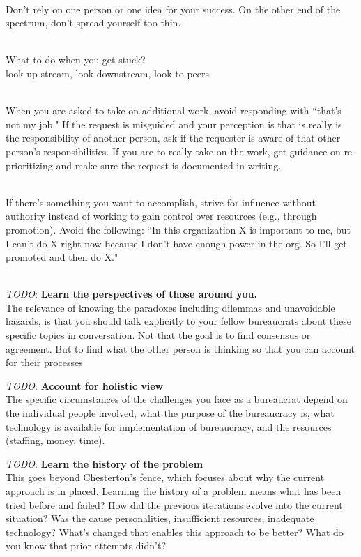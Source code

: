\ \\

Don't rely on one person or one idea for your success. On the other end of the spectrum, don't spread yourself too thin. 

\ \\

What to do when you get stuck?\\
look up stream, look downstream, look to peers

\ \\

When you are asked to take on additional work, avoid responding with ``that's not my job." If the request is misguided and your perception is that is really is the responsibility of another person, ask if the requester is aware of that other person's responsibilities. If you are to really take on the work, get guidance on re-prioritizing and make sure the request is documented in writing. 

\ \\

If there's something you want to accomplish, strive for influence without authority instead of working to gain control over resources (e.g., through promotion). Avoid the following: ``In this organization X is important to me, but I can't do X right now because I don't have enough power in the org. So I'll get promoted and then do X."

\ \\



\textit{TODO}: \textbf{Learn the perspectives of those around you.}\\
The relevance of knowing the paradoxes including dilemmas and unavoidable hazards, is that you should talk explicitly to your fellow bureaucrats about these specific topics in conversation. Not that the goal is to find consensus or agreement. But to find what the other person is thinking so that you can account for their processes


\textit{TODO}: \textbf{Account for holistic view}\\
The specific circumstances of the challenges you face as a bureaucrat depend on the individual people involved, what the purpose of the bureaucracy is, what technology is available for implementation of bureaucracy, and the resources (staffing, money, time). 

\textit{TODO}: \textbf{Learn the history of the problem}\\
This goes beyond Chesterton's fence, which focuses about why the current approach is in placed. Learning the history of a problem means what has been tried before and failed? How did the previous iterations evolve into the current situation? Was the cause personalities, insufficient resources, inadequate technology? What's changed that enables this approach to be better? What do you know that prior attempts didn't?

